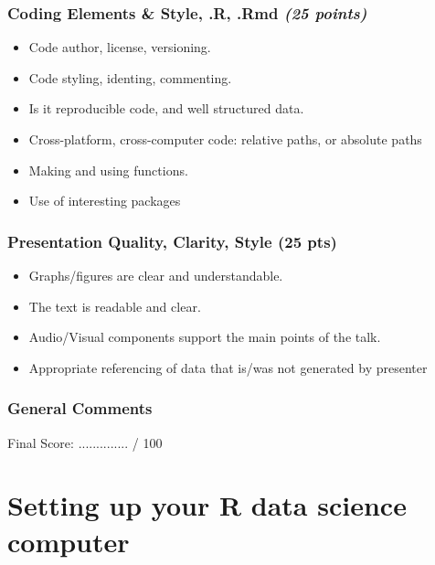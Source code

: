\documentclass[10pt]{article} %
\begin{document}
      \subsubsection{Coding Elements \& Style, .R, .Rmd \emph{(25 points)}}
        \begin{itemize}  \itemsep0pt
            \item{Code author, license, versioning.}
            \item{Code styling, identing, commenting.}
            \item{Is it reproducible code, and well structured data.}
            \item{Cross-platform, cross-computer code: relative paths, or absolute paths}
            \item{Making and using functions.}
            \item{Use of interesting packages}
        \end{itemize}

      \subsubsection{Presentation Quality, Clarity, Style (25 pts)}
        \begin{itemize}  \itemsep0pt
            \item{Graphs/figures are clear and understandable.}
            \item{The text is readable and clear.}
            \item{Audio/Visual components support the main points of the talk.}
            \item{Appropriate referencing of data that is/was not generated by presenter}
        \end{itemize}

      \subsubsection{General  Comments}
        \begin{flushright}
         Final Score:  ..............  / 100
        \end{flushright}



\pagebreak


\section{Setting up your R data science computer}
\end{document}
